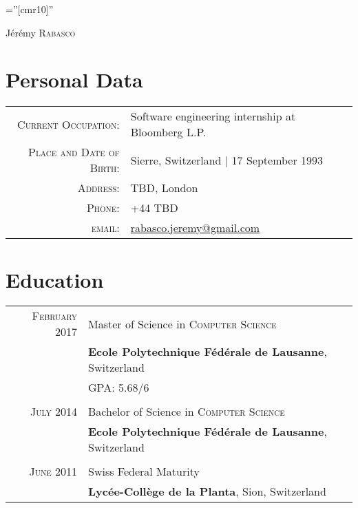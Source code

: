\documentclass[a4paper,10pt]{article}
\begin{document}
\pagestyle{empty}
\font\fb=''[cmr10]''

\par{\centering
		{\Huge Jérémy \textsc{Rabasco}
	}\bigskip\par}

\section{Personal Data}

\begin{tabular}{rl}
	\textsc{Current Occupation:} & Software engineering internship at Bloomberg L.P.\\
	\textsc{Place and Date of Birth:} & Sierre, Switzerland | 17 September 1993 \\
	\textsc{Address:}   & TBD, London \\
	\textsc{Phone:}     & +44 TBD\\
	\textsc{email:}     & \href{mailto:rabasco.jeremy@gmail.com}{rabasco.jeremy@gmail.com}
\end{tabular}

\section{Education}
\begin{tabular}{rl}	
	\textsc{February 2017} & Master of Science in \textsc{Computer Science} \\
	& \textbf{Ecole Polytechnique Fédérale de Lausanne}, Switzerland\\
	&\normalsize \textsc{GPA}: 5.68/6\\\\
	\textsc{July} 2014 & Bachelor of Science in \textsc{Computer Science}\\
	& \textbf{Ecole Polytechnique Fédérale de Lausanne}, Switzerland\\\\
	\textsc{June 2011} & Swiss Federal Maturity\\
	&\textbf{Lycée-Collège de la Planta}, Sion, Switzerland
\end{tabular}

\end{document}

